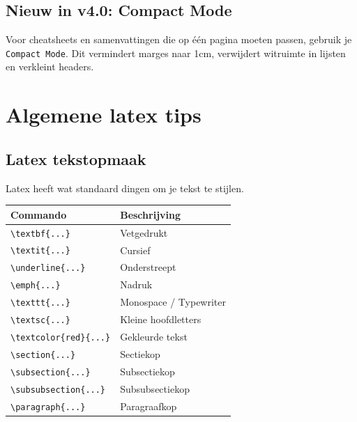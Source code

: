 \documentclass[a4paper,11pt]{article}
\begin{document}
\subsection{Nieuw in v4.0: Compact Mode}
Voor cheatsheets en samenvattingen die op één pagina moeten passen, gebruik je \texttt{Compact Mode}.
Dit vermindert marges naar 1cm, verwijdert witruimte in lijsten en verkleint headers.


\section{Algemene latex tips}
\subsection{Latex tekstopmaak}

Latex heeft wat standaard dingen om je tekst te stijlen.

\begin{tabular}{lp{}}
\toprule
\textbf{Commando} & \textbf{Beschrijving} \\
\midrule
\verb|\textbf{...}| & Vetgedrukt \\
\verb|\textit{...}| & Cursief \\
\verb|\underline{...}| & Onderstreept \\
\verb|\emph{...}| & Nadruk \\
\verb|\texttt{...}| & Monospace / Typewriter \\
\verb|\textsc{...}| & Kleine hoofdletters \\
\verb|\textcolor{red}{...}| & Gekleurde tekst \\
\verb|\section{...}| & Sectiekop \\
\verb|\subsection{...}| & Subsectiekop \\
\verb|\subsubsection{...}| & Subsubsectiekop \\
\verb|\paragraph{...}| & Paragraafkop \\
\bottomrule
\end{tabular}
\end{document}
